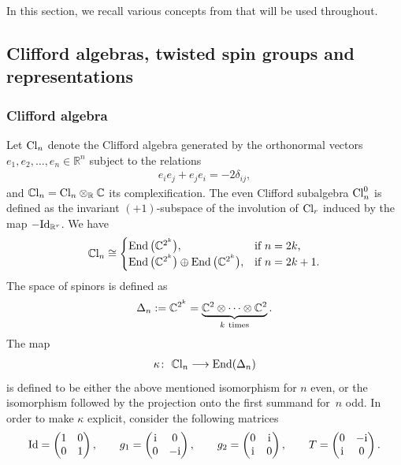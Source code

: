 \documentclass[10pt,a4paper]{amsart}
\newcommand{\lra}{\longrightarrow}
\numberwithin{equation}{section}
\begin{document}
In this section, we recall various concepts from \cite{Espinosa-Herrera, Friedrich,Lawson} that will be used throughout.

\subsection{Clifford algebras, twisted spin groups and representations}

\subsubsection{Clifford algebra}

Let ${\rm Cl}_n$ denote the Clifford algebra generated by the orthonormal vectors $e_1, e_2, \dots, e_n\in \mathbb{R}^n$ subject to the relations
\begin{gather*}
e_i e_j + e_j e_i = -2\delta_{ij},
\end{gather*}
and $\mathbb{C}{\rm l}_n={\rm Cl}_n\otimes_{\mathbb{R}}\mathbb{C}$ its complexification. The even Clifford subalgebra ${\rm Cl}_n^0$ is defined as the invariant $(+1)$-subspace of the involution of ${\rm Cl}_r$
induced
by the map $-{\rm Id}_{\mathbb{R}^r}$.
We have
\begin{gather*} \mathbb{C}{\rm l}_n\cong
 \begin{cases}
 \operatorname{End}\big(\mathbb{C}^{2^k}\big), & \mbox{if $n=2k$,}\\
 \operatorname{End}\big(\mathbb{C}^{2^k}\big)\oplus\operatorname{End}\big(\mathbb{C}^{2^k}\big), & \mbox{if $n=2k+1$.}
 \end{cases}
\end{gather*}
The space of spinors is defined as
\begin{gather*} \Delta_n:=\mathbb{C}^{2^k}=\underbrace{\mathbb{C}^2\otimes \dots \otimes \mathbb{C}^2}_{k\ {\rm times}}.\end{gather*}
The map
\begin{gather*} \kappa\colon \ \mathbb{C}{\rm l}_n \lra \operatorname{End}(\Delta_n)\end{gather*}
is defined to be either the above mentioned isomorphism for $n$ even, or the isomorphism followed by the projection onto the first summand for~$n$ odd. In order to make $\kappa$ explicit, consider the following matrices
\begin{gather*} {\rm Id} = \left(\begin{matrix}
1 & 0\\
0 & 1
 \end{matrix}\right),\qquad
g_1 = \left(\begin{matrix}
{\rm i} & 0\\
0 & -{\rm i}
 \end{matrix}\right),\qquad
g_2 = \left(\begin{matrix}
0 & {\rm i}\\
{\rm i} & 0
 \end{matrix}\right),\qquad
T = \left(\begin{matrix}
0 & -{\rm i}\\
{\rm i} & 0
 \end{matrix}\right).
\end{gather*}
\end{document}
